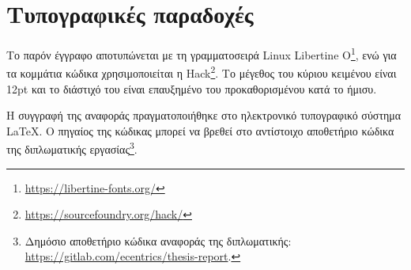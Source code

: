 \section{Τυπογραφικές παραδοχές} \label{section:1-6-typography}

Το παρόν έγγραφο αποτυπώνεται με τη γραμματοσειρά Linux Libertine O\footnote{\url{https://libertine-fonts.org/}}, ενώ για τα κομμάτια κώδικα χρησιμοποιείται η Hack\footnote{\url{https://sourcefoundry.org/hack/}}. Το μέγεθος του κύριου κειμένου είναι 12pt και το διάστιχό του είναι επαυξημένο του προκαθορισμένου κατά το ήμισυ.


Η συγγραφή της αναφοράς πραγματοποιήθηκε στο ηλεκτρονικό τυπογραφικό σύστημα \LaTeX. Ο πηγαίος της κώδικας μπορεί να βρεθεί στο αντίστοιχο αποθετήριο κώδικα της διπλωματικής εργασίας\footnote{Δημόσιο αποθετήριο κώδικα αναφοράς της διπλωματικής: \url{https://gitlab.com/ecentrics/thesis-report}.}.
